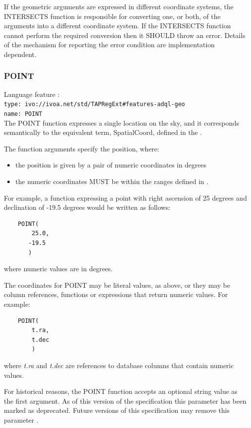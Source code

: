 \documentclass[11pt,a4paper]{ivoa}
\begin{document}
If the geometric arguments are expressed in different coordinate systems,
the INTERSECTS function is responsible for converting one, or both, of the
arguments into a different coordinate system.
If the INTERSECTS function cannot perform the required conversion then
it SHOULD throw an error.
Details of the mechanism for reporting the error condition are
implementation dependent.

\subsubsection{POINT}
\label{sec:functions.geom.point}
{\footnotesize Language feature :}\\
{\footnotesize \verb|type: ivo://ivoa.net/std/TAPRegExt#features-adql-geo|}\\
{\footnotesize \verb|name: POINT|}\\

The POINT function expresses a single location on the sky,
and it corresponds semantically to the equivalent term, SpatialCoord, defined in
the \STCSpec.

The function arguments specify the position, where:
\begin{itemize}
    \item the position is given by a pair of numeric coordinates in degrees
    \item the numeric coordinates MUST be within the ranges defined in
    .
\end{itemize}

For example, a function expressing a point with right ascension of 25 degrees
and declination of -19.5 degrees would be written as follows:
\begin{verbatim}
    POINT(
        25.0,
       -19.5
       )
\end{verbatim}
\noindent
where numeric values are in degrees.

The coordinates for POINT may be literal values, as above,
or they may be column references, functions or expressions that return
numeric values.
For example:
\begin{verbatim}
    POINT(
        t.ra,
        t.dec
        )
\end{verbatim}
\noindent
where \textit{t.ra} and \textit{t.dec} are references to database
columns that contain numeric values.

For historical reasons, the POINT function accepts an optional string
value as the first argument.
As of this version of the specification this parameter has been
marked as deprecated.
Future versions of this specification may remove this parameter
.
\end{document}
